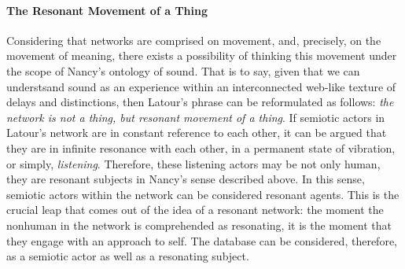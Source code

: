 \paragraph{The Resonant Movement of a Thing}
Considering that networks are comprised on movement, and, precisely, on the movement of meaning, there exists a possibility of thinking this movement under the scope of Nancy's ontology of sound. That is to say, given that we can understsand sound as an experience within an interconnected web-like texture of delays and distinctions, then Latour's phrase can be reformulated as follows: \textit{the network is not a thing, but resonant movement of a thing}. If semiotic actors in Latour's network are in constant reference to each other, it can be argued that they are in infinite resonance with each other, in a permanent state of vibration, or simply, \textit{listening}. Therefore, these listening actors may be not only human, they are resonant subjects in Nancy's sense described above. In this sense, semiotic actors within the network can be considered resonant agents. This is the crucial leap that comes out of the idea of a resonant network: the moment the nonhuman in the network is comprehended as resonating, it is the moment that they engage with an approach to self. The database can be considered, therefore, as a semiotic actor as well as a resonating subject. 




















